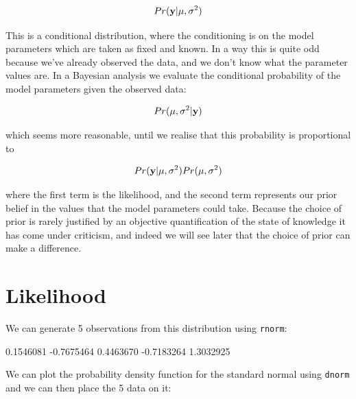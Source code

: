 \documentclass{article}
\begin{document}
\begin{displaymath}
Pr({\bf y} | \mu, \sigma^{2})
\end{displaymath}

This is a conditional distribution, where the conditioning is on the model parameters which are taken as fixed and known. In a way this is quite odd because we've already observed the data, and we don't know what the parameter values are. In a Bayesian analysis we evaluate the conditional probability of the model parameters given the observed data:

\begin{displaymath}
Pr(\mu, \sigma^{2} | {\bf y})
\label{post1-eq}
\end{displaymath}
 
which seems more reasonable, until we realise that this probability is proportional to 

\begin{displaymath}
Pr({\bf y} | \mu, \sigma^{2})Pr(\mu, \sigma^{2})
\end{displaymath}

where the first term is the likelihood, and the second term represents our prior belief in the values that the model parameters could take. Because the choice of prior is rarely justified by an objective quantification of the state of knowledge it has come under criticism, and indeed we will see later that the choice of prior can make a difference. 

\section{Likelihood}

We can generate 5 observations from this distribution using \texttt{rnorm}:

\begin{Schunk}
\begin{Soutput}
[1]  0.1546081 -0.7675464  0.4463670 -0.7183264  1.3032925
\end{Soutput}
\end{Schunk}

We can plot the probability density function for the standard normal using \texttt{dnorm} and we can then place the 5 data on it:
\end{document}
